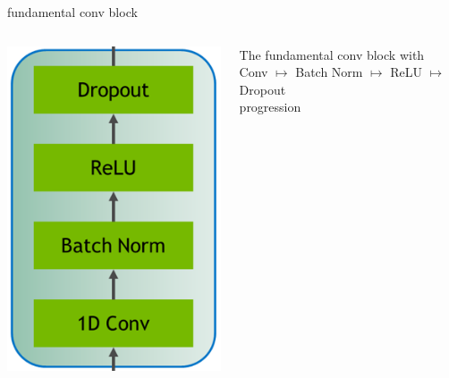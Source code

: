 \documentclass[aspectratio=169,xcolor={dvipsnames,svgnames}]{beamer}
\begin{document}
\begin{frame}[label={sec:org6c6d0bc}]{fundamental conv block}
\begin{columns}
\begin{column}{0.2\columnwidth}
\begin{center}
\includegraphics[width=.9\linewidth]{org-download-images/Contribution/2024-09-16_22-58-22_screenshot.png}
\end{center}
\end{column}

\begin{column}{0.8\columnwidth}
The fundamental conv block with \\[0pt]
Conv \(\mapsto\) Batch Norm \(\mapsto\) ReLU \(\mapsto\)
Dropout \\[0pt]
progression
\end{column}
\end{columns}
\end{frame}
\end{document}
